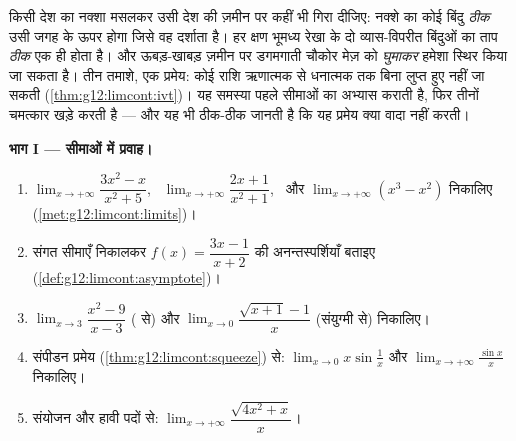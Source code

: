 \begin{problem}
\label{pb:g12:limcont:1}
किसी देश का नक्शा मसलकर उसी देश की ज़मीन पर कहीं भी गिरा दीजिए: नक्शे का कोई
बिंदु \emph{ठीक} उसी जगह के ऊपर होगा जिसे वह दर्शाता है। हर क्षण भूमध्य रेखा
के दो व्यास-विपरीत बिंदुओं का ताप \emph{ठीक} एक ही होता है। और ऊबड़-खाबड़
ज़मीन पर डगमगाती चौकोर मेज़ को \emph{घुमाकर} हमेशा स्थिर किया जा सकता है। तीन
तमाशे, एक प्रमेय: कोई  राशि ऋणात्मक से धनात्मक तक बिना लुप्त हुए नहीं जा
सकती (\cref{thm:g12:limcont:ivt})। यह समस्या पहले सीमाओं का अभ्यास कराती है, फिर तीनों चमत्कार
खड़े करती है --- और यह भी ठीक-ठीक जानती है कि यह प्रमेय क्या वादा नहीं करती।

\medskip
\noindent\textbf{भाग I --- सीमाओं में प्रवाह।}
\begin{enumerate}
  \item $\lim_{x \to +\infty} \dfrac{3x^2 - x}{x^2 + 5}$, \ $\lim_{x \to +\infty} \dfrac{2x + 1}{x^2 + 1}$, \ और $\lim_{x \to +\infty} (x^3 - x^2)$ निकालिए (\cref{met:g12:limcont:limits})।
  \item संगत सीमाएँ निकालकर
        $f(x) = \dfrac{3x - 1}{x + 2}$
        की अनन्तस्पर्शियाँ बताइए (\cref{def:g12:limcont:asymptote})।
  \item $\lim_{x \to 3} \dfrac{x^2 - 9}{x - 3}$ ( से) और $\lim_{x \to 0} \dfrac{\sqrt{x + 1} - 1}{x}$ (संयुग्मी से) निकालिए।
  \item संपीडन प्रमेय (\cref{thm:g12:limcont:squeeze}) से: $\lim_{x \to 0} x \sin\frac1x$ और $\lim_{x \to +\infty} \frac{\sin x}{x}$ निकालिए।
  \item संयोजन और हावी पदों से: $\lim_{x \to +\infty} \dfrac{\sqrt{4x^2 + x}}{x}$।
\end{enumerate}


\end{problem}
